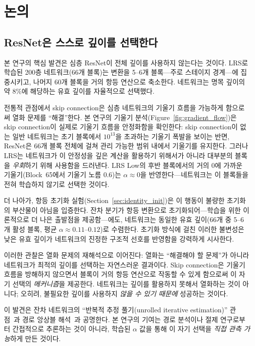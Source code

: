 \documentclass[preprint,12pt]{elsarticle}
\begin{document}
\section{논의}
\label{sec:discussion}

\subsection{ResNet은 스스로 깊이를 선택한다}

본 연구의 핵심 발견은 심층 ResNet이 전체 깊이를 사용하지 않는다는 것이다. LRS로 학습된 200층 네트워크(66개 블록)는 변환을 5--6개 블록---주로 스테이지 경계---에 집중시키고, 나머지 60개 블록을 거의 항등 연산으로 축소한다. 네트워크는 명목 깊이의 약 8\%에 해당하는 유효 깊이를 자율적으로 선택했다.

전통적 관점에서 skip connection은 심층 네트워크의 기울기 흐름을 가능하게 함으로써 열화 문제를 ``해결''한다. 본 연구의 기울기 분석(Figure~\ref{fig:gradient_flow})은 skip connection이 실제로 기울기 흐름을 안정화함을 확인한다: skip connection이 없는 일반 네트워크는 초기 블록에서 $10^{13}$을 초과하는 기울기 폭발을 보이는 반면, ResNet은 66개 블록 전체에 걸쳐 관리 가능한 범위 내에서 기울기를 유지한다. 그러나 LRS는 네트워크가 이 안정성을 깊은 계산을 활용하기 위해서가 아니라 대부분의 블록을 \emph{우회}하기 위해 사용함을 드러낸다. LRS Low의 후반 블록에서의 거의 0에 가까운 기울기(Block~65에서 기울기 노름 $0.6$)는 $\alpha \approx 0$을 반영한다---네트워크는 이 블록들을 전혀 학습하지 않기로 선택한 것이다.

더 나아가, 항등 초기화 실험(Section~\ref{sec:identity_init})은 이 행동이 불량한 초기화의 부산물이 아님을 입증한다. 잔차 분기가 항등 변환으로 초기화되어---학습을 위한 이론적으로 더 나은 출발점을 제공함---에도, 네트워크는 동일한 유효 깊이(66개 중 5--6개 활성 블록, 평균 $\alpha \approx 0.11$--$0.12$)로 수렴한다. 초기화 방식에 걸친 이러한 불변성은 낮은 유효 깊이가 네트워크의 진정한 구조적 선호를 반영함을 강력하게 시사한다.

이러한 관찰은 열화 문제의 재해석으로 이어진다: 열화는 ``해결해야 할 문제''가 아니라 네트워크가 최적의 깊이를 선택하는 자연스러운 결과이다. Skip connection은 기울기 흐름을 방해하지 않으면서 블록이 거의 항등 연산으로 작동할 수 있게 함으로써 이 자기 선택의 \emph{메커니즘}을 제공한다. 네트워크는 깊이를 활용하지 못해서 열화하는 것이 아니다; 오히려, 불필요한 깊이를 사용하지 \emph{않을 수 있기 때문에} 성공하는 것이다.

이 발견은 잔차 네트워크의 ``반복적 추정 풀기(unrolled iterative estimation)'' 관점~\cite{greff2017highway}과 경로 앙상블 해석~\cite{veit2016residual}과 공명한다. 본 연구의 기여는 경로 분석이나 절제 연구로부터 간접적으로 추론하는 것이 아니라, 학습된 $\alpha$ 값을 통해 이 자기 선택을 \emph{직접 관측 가능}하게 만든 것이다.
\end{document}
